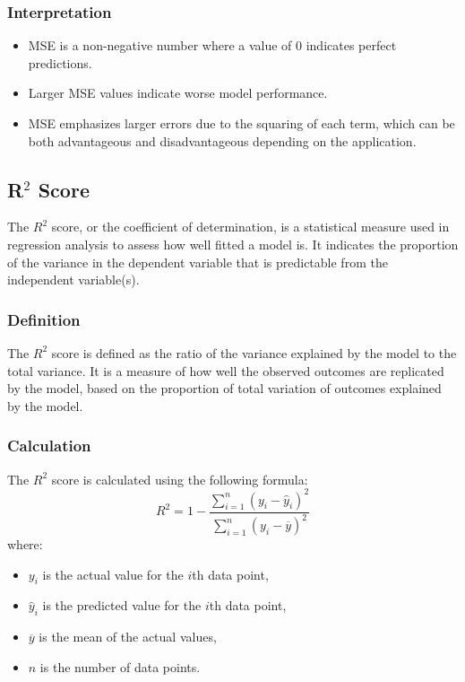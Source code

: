 \subsubsection{Interpretation}
\begin{itemize}
	\item MSE is a non-negative number where a value of 0 indicates perfect predictions.
	\item Larger MSE values indicate worse model performance.
	\item MSE emphasizes larger errors due to the squaring of each term, which can be both advantageous and disadvantageous depending on the application.
\end{itemize}

\subsection{R\(^2\) Score}

The \(R^2\) score, or the coefficient of determination, is a statistical measure used in regression analysis to assess how well fitted a model is. It indicates the proportion of the variance in the dependent variable that is predictable from the independent variable(s).

\subsubsection{Definition}
The \(R^2\) score is defined as the ratio of the variance explained by the model to the total variance. It is a measure of how well the observed outcomes are replicated by the model, based on the proportion of total variation of outcomes explained by the model.

\subsubsection{Calculation}
The \(R^2\) score is calculated using the following formula:
\begin{equation}
	R^2 = 1 - \frac{\sum_{i=1}^{n} (y_i - \hat{y}_i)^2}{\sum_{i=1}^{n} (y_i - \overline{y})^2}
\end{equation}
where:
\begin{itemize}
	\item \(y_i\) is the actual value for the \(i\)th data point,
	\item \(\hat{y}_i\) is the predicted value for the \(i\)th data point,
	\item \(\overline{y}\) is the mean of the actual values,
	\item \(n\) is the number of data points.
\end{itemize}

